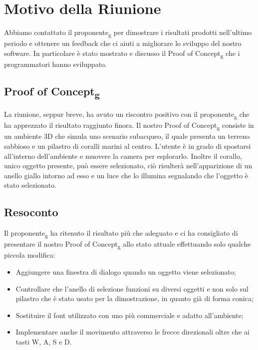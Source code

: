 \section{Motivo della Riunione}
Abbiamo contattato il proponente\textsubscript{g} per dimostrare i risultati prodotti nell'ultimo periodo e ottenere un feedback che ci aiuti a migliorare lo sviluppo del nostro software. \newline
In particolare è stato mostrato e discusso il Proof of Concept\textsubscript{g} che i programmatori hanno sviluppato.

\subsection{Proof of Concept\textsubscript{g}}
La riunione, seppur breve, ha avuto un riscontro positivo con il proponente\textsubscript{g} che ha apprezzato il risultato raggiunto finora. \newline
Il nostro Proof of Concept\textsubscript{g} consiste in un ambiente 3D che simula uno scenario subacqueo, il quale presenta un terreno sabbioso e un pilastro di coralli marini al centro. \newline
L'utente è in grado di spostarsi all'interno dell'ambiente e muovere la camera per esplorarlo. \newline
Inoltre il corallo, unico oggetto presente, può essere selezionato, ciò risulterà nell'apparizione di un anello giallo intorno ad esso e un luce che lo illumina segnalando che l'oggetto è stato selezionato.

\subsection{Resoconto}
Il proponente\textsubscript{g} ha ritenuto il risultato più che adeguato e ci ha consigliato di presentare il nostro Proof of Concept\textsubscript{g} allo stato attuale effettuando solo qualche piccola modifica: \begin{itemize}
	\item Aggiungere una finestra di dialogo quando un oggetto viene selezionato;
	\item Controllare che l'anello di selezione funzioni su diversi oggetti e non solo sul pilastro che è stato usato per la dimostrazione, in quanto già di forma conica;
	\item Sostituire il font utilizzato con uno più commerciale e adatto all'ambiente;
	\item Implementare anche il movimento attraverso le frecce direzionali oltre che ai tasti W, A, S e D. 
\end{itemize}

